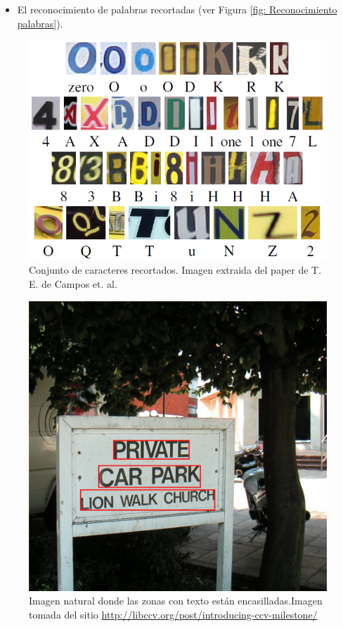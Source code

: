 \begin{itemize}
		\item El reconocimiento de palabras recortadas (ver Figura \ref{fig: Reconocimiento palabras}).
	\end{itemize}
	
	\begin{figure}[htbp]
		\centering
  		\centerline{ \includegraphics[scale=0.5]{img/hog/confusing_english.png} }
		\caption[Clasificación de caracteres recortados]{Conjunto de caracteres recortados. Imagen extraida del paper de T. E. de Campos et. al. \cite{dCBV09}}
		\label{fig: Caracteres recortados}
	\end{figure}
	
	\begin{figure}[htbp]
		\centering
		\centerline{ \includegraphics[scale=0.25]{img/zone_with_text.png} }
		\caption[Detección de zonas con texto]{Imagen natural donde las zonas con texto están encasilladas.Imagen tomada del sitio \url{http://libccv.org/post/introducing-ccv-milestone/} }
		\label{fig: Zona texto}
	\end{figure}
	
